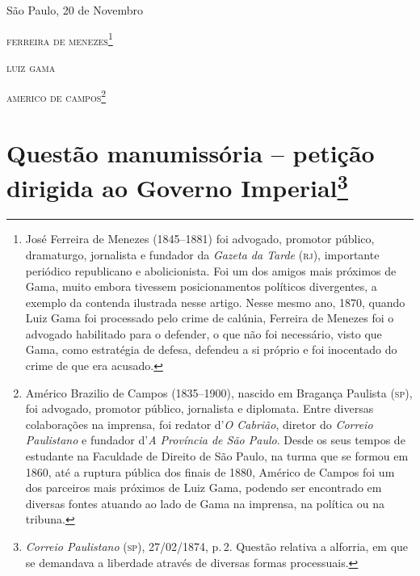 \begin{flushright}
São Paulo, 20 de Novembro

\textsc{ferreira de menezes}\footnote{ José Ferreira de Menezes (1845--1881) foi
  advogado, promotor público, dramaturgo, jornalista e fundador da
  \emph{Gazeta da Tarde} (\textsc{rj}), importante periódico republicano e
  abolicionista. Foi um dos amigos mais próximos de Gama, muito embora
  tivessem posicionamentos políticos divergentes, a exemplo da contenda
  ilustrada nesse artigo. Nesse mesmo ano, 1870, quando Luiz Gama foi
  processado pelo crime de calúnia, Ferreira de Menezes foi o advogado
  habilitado para o defender, o que não foi necessário, visto que Gama,
  como estratégia de defesa, defendeu a si próprio e foi inocentado do
  crime de que era acusado.}

\textsc{luiz gama}

\textsc{americo de campos}\footnote{ Américo Brazilio de Campos (1835--1900),
  nascido em Bragança Paulista (\textsc{sp}), foi advogado, promotor público,
  jornalista e diplomata. Entre diversas colaborações na imprensa, foi
  redator d'\emph{O Cabrião}, diretor do \emph{Correio Paulistano} e
  fundador d'\emph{A Província de São Paulo}. Desde os seus tempos de
  estudante na Faculdade de Direito de São Paulo, na turma que se formou
  em 1860, até a ruptura pública dos finais de 1880, Américo de Campos
  foi um dos parceiros mais próximos de Luiz Gama, podendo ser
  encontrado em diversas fontes atuando ao lado de Gama na imprensa, na
  política ou na tribuna.}
\end{flushright}

\chapter{Questão manumissória -- petição dirigida ao Governo
Imperial\footnote{\emph{Correio Paulistano} (\textsc{sp}), 27/02/1874, p.\,2.
  Questão relativa a alforria, em que se demandava a liberdade através
  de diversas formas processuais.}} %


